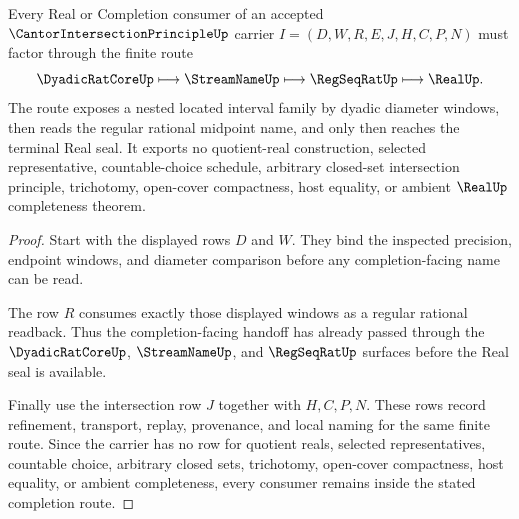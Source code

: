 \begin{theorem}
\label{thm:cantor-intersection-principle-completion-route}
Every Real or Completion consumer of an accepted $\CantorIntersectionPrincipleUp$ carrier $I=(D,W,R,E,J,H,C,P,N)$ must factor through the finite route
$$
\DyadicRatCoreUp \longmapsto \StreamNameUp \longmapsto \RegSeqRatUp \longmapsto \RealUp .
$$
The route exposes a nested located interval family by dyadic diameter windows, then reads the regular rational midpoint name, and only then reaches the terminal Real seal. It exports no quotient-real construction, selected representative, countable-choice schedule, arbitrary closed-set intersection principle, trichotomy, open-cover compactness, host equality, or ambient $\RealUp$ completeness theorem.
\end{theorem}
\begin{proof}
Start with the displayed rows $D$ and $W$. They bind the inspected precision, endpoint windows, and diameter comparison before any completion-facing name can be read.

The row $R$ consumes exactly those displayed windows as a regular rational readback. Thus the completion-facing handoff has already passed through the $\DyadicRatCoreUp$, $\StreamNameUp$, and $\RegSeqRatUp$ surfaces before the Real seal is available.

Finally use the intersection row $J$ together with $H,C,P,N$. These rows record refinement, transport, replay, provenance, and local naming for the same finite route. Since the carrier has no row for quotient reals, selected representatives, countable choice, arbitrary closed sets, trichotomy, open-cover compactness, host equality, or ambient completeness, every consumer remains inside the stated completion route.
\end{proof}



